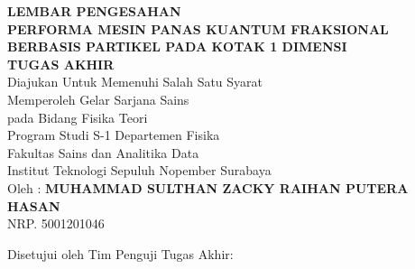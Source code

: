 \begin{center}
\large{\textbf{LEMBAR PENGESAHAN}} \\
\vspace{4mm}
\textbf{PERFORMA MESIN PANAS KUANTUM FRAKSIONAL BERBASIS PARTIKEL PADA KOTAK 1 DIMENSI} \\
\vspace{4mm}
\textbf{TUGAS AKHIR} \\
\vspace{4mm}
Diajukan Untuk Memenuhi Salah Satu Syarat \\
Memperoleh Gelar Sarjana Sains \\
pada Bidang Fisika Teori \\
Program Studi S-1 Departemen Fisika \\
Fakultas Sains dan Analitika Data\\
Institut Teknologi Sepuluh Nopember Surabaya \\
\vspace{4mm}
Oleh : \textbf{MUHAMMAD SULTHAN ZACKY RAIHAN PUTERA HASAN} \\
\vspace{1mm}
NRP. 5001201046 \\
\vspace{4mm}
\begin{center}
	Disetujui oleh Tim Penguji Tugas Akhir:
\end{center}

\vspace{4ex}

\begingroup
\setlength{\tabcolsep}{0pt}


\end{center}
